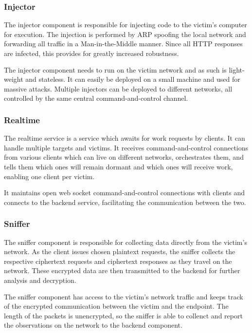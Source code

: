 \documentclass[conference, letterpaper, 10pt]{IEEEtran}
\begin{document}
\subsubsection{Injector}

The injector component is responsible for injecting code to the victim's
computer for execution. The injection is performed by ARP spoofing the local
network and forwarding all traffic in a Man-in-the-Middle manner. Since all HTTP
responses are infected, this provides for greatly increased robustness.

The injector component needs to run on the victim network and as such is
light-weight and stateless. It can easily be deployed on a small machine and
used for massive attacks. Multiple injectors can be deployed to different
networks, all controlled by the same central command-and-control channel.

\subsubsection{Realtime}

The realtime service is a service which awaits for work requests by clients. It
can handle multiple targets and victims. It receives command-and-control
connections from various clients which can live on different networks,
orchestrates them, and tells them which ones will remain dormant and which ones
will receive work, enabling one client per victim.

It maintains open web socket command-and-control connections with clients and
connects to the backend service, facilitating the communication between the two.

\subsubsection{Sniffer}

The sniffer component is responsible for collecting data directly from the
victim's network. As the client issues chosen plaintext requests, the sniffer
collects the respective ciphertext requests and ciphertext responses as they
travel on the network. These encrypted data are then transmitted to the backend
for further analysis and decryption.

The sniffer component has access to the victim's network traffic and
keeps track of the encrypted communication between the victim and the endpoint.
The length of the packets is unencrypted, so the sniffer is able to collenct and
report the observations on the network to the backend component.
\end{document}
